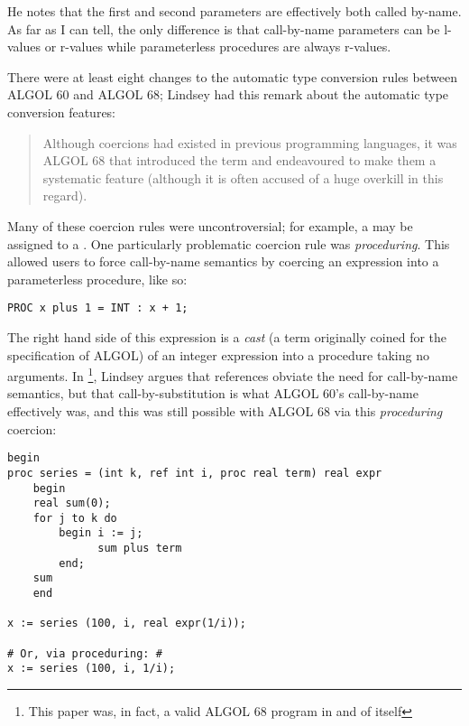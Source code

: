 

He notes that the first and second parameters are effectively both called by-name.
As far as I can tell, the only difference is that call-by-name parameters can
be l-values or r-values while parameterless procedures are always r-values.

There were at least eight changes to the automatic type conversion rules
between ALGOL 60 and ALGOL 68;
Lindsey had this remark about the automatic type conversion features:
\begin{quotation}
	Although coercions had existed in previous programming languages, it was ALGOL
	68 that introduced the term and endeavoured to make them a systematic feature
	(although it is often accused of a huge overkill in this regard).
\end{quotation}

Many of these coercion rules were uncontroversial; for example, a 
may be assigned to a .
One particularly problematic coercion rule was \textit{proceduring}.
This allowed users to force call-by-name semantics by coercing an expression
into a parameterless procedure, like so:

\begin{lstlisting}[language=algol,frame=single]
      PROC x plus 1 = INT : x + 1;
\end{lstlisting}

The right hand side of this expression is a \textit{cast}
(a term originally coined for the specification of ALGOL)
of an integer expression into a procedure taking no arguments.
In \footnote{This paper was, in fact,
	a valid ALGOL 68 program in and of itself}, Lindsey argues that references
obviate the need for call-by-name semantics, but that call-by-substitution is what
ALGOL 60's call-by-name effectively was, and this was still possible with ALGOL 68
via this \textit{proceduring} coercion:

\begin{lstlisting}[language=algol,frame=single]
begin
proc series = (int k, ref int i, proc real term) real expr
    begin
    real sum(0);
    for j to k do
        begin i := j;
              sum plus term
        end;
    sum
    end

x := series (100, i, real expr(1/i));

# Or, via proceduring: #
x := series (100, i, 1/i);
\end{lstlisting}

